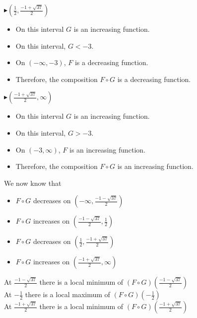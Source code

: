 \documentclass{ximera}
\begin{document}
\begin{example}
\textbf{\textcolor{blue!55!black}{$\blacktriangleright (\frac{1}{2}, \frac{-1 + \sqrt{37}}{2})$}}


\begin{itemize}
\item On this interval $G$ is an increasing function.
\item On this interval, $G < -3$.
\item On $(-\infty, -3)$, $F$ is a decreasing function.
\item Therefore, the composition $F \circ G$ is a decreasing function.
\end{itemize}










\textbf{\textcolor{blue!55!black}{$\blacktriangleright (\frac{-1 + \sqrt{37}}{2}, \infty)$}}


\begin{itemize}
\item On this interval $G$ is an increasing function.
\item On this interval, $G > -3$.
\item On $(-3, \infty)$, $F$ is an increasing function.
\item Therefore, the composition $F \circ G$ is an increasing function.
\end{itemize}





We now know that 

\begin{itemize}
\item $F \circ G$ decreases on $(-\infty, \frac{-1 - \sqrt{37}}{2})$ \\
\item $F \circ G$ increases on $(\frac{-1 - \sqrt{37}}{2}, \frac{1}{2})$ \\
\item $F \circ G$ decreases on $(\frac{1}{2}, \frac{-1 + \sqrt{37}}{2})$ \\
\item $F \circ G$ increases on $(\frac{-1 + \sqrt{37}}{2}, \infty)$
\end{itemize}




At $\frac{-1 - \sqrt{37}}{2}$ there is a local minimum of $(F \circ G)\left( \frac{-1 - \sqrt{37}}{2} \right)$ \\


At $-\frac{1}{2}$ there is a local maximum of $(F \circ G)\left( -\frac{1}{2} \right)$ \\


At $\frac{-1 + \sqrt{37}}{2}$ there is a local minimum of $(F \circ G)\left( \frac{-1 + \sqrt{37}}{2} \right)$ \\




\end{example}
\end{document}

